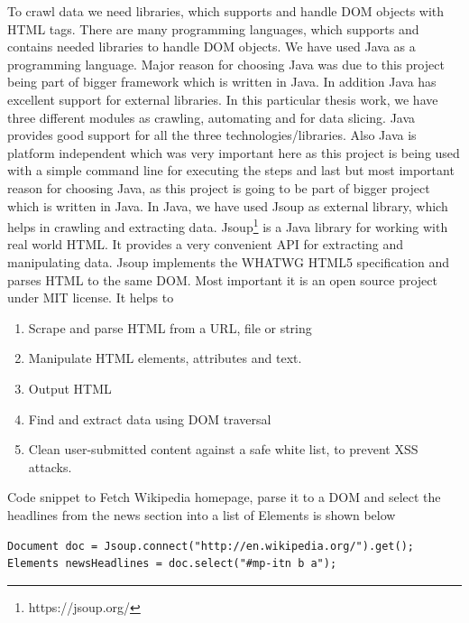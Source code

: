 \documentclass[article,type=msc,colorback,accentcolor=tud9c,twoside,11pt]{tudthesis}
\begin{document}
To crawl data we need libraries, which supports and handle DOM objects with HTML tags. There are many programming languages, which supports and contains needed libraries to handle DOM objects. We have used Java as a programming language. Major reason for choosing Java was due to this project being part of bigger framework which is written in Java. In addition Java has excellent support for external libraries. In this particular thesis work, we have three different modules as crawling, automating and for data slicing. Java provides good support for all the three technologies/libraries. Also Java is platform independent which was very important here as this project is being used with a simple command line for executing the steps and last but most important reason for choosing Java, as this project is going to be part of bigger project which is written in Java. In Java, we have used Jsoup as external library, which helps in crawling and extracting data. Jsoup\footnote{https://jsoup.org/} is a Java library for working with real world HTML. It provides a very convenient API for extracting and manipulating data. Jsoup implements the WHATWG HTML5 specification and parses HTML to the same DOM. Most important it is an open source project under MIT license. It helps to
\begin{enumerate}
\item Scrape and parse HTML from a URL, file or string
\item Manipulate HTML elements, attributes and text.
\item Output HTML
\item Find and extract data using DOM traversal
\item Clean user-submitted content against a safe white list, to prevent XSS attacks.
\end{enumerate}
Code snippet to Fetch Wikipedia homepage, parse it to a DOM and select the headlines from the news section into a list of Elements is shown below

\begin{lstlisting}
Document doc = Jsoup.connect("http://en.wikipedia.org/").get();
Elements newsHeadlines = doc.select("#mp-itn b a");
\end{lstlisting}
\end{document}
